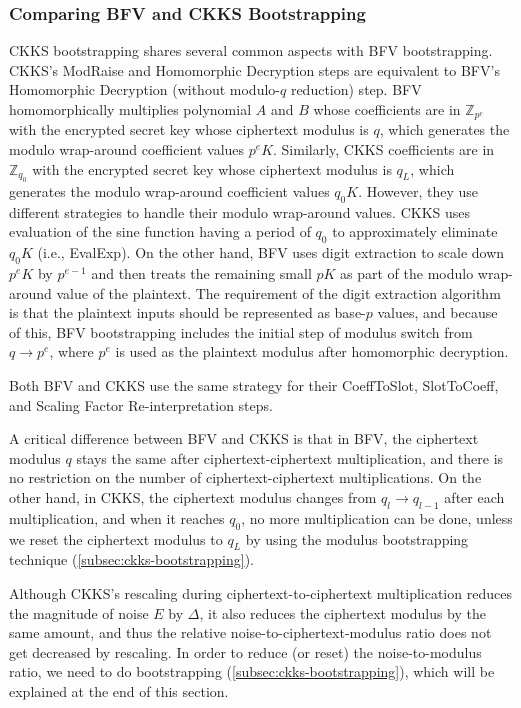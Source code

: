 \subsubsection{Comparing BFV and CKKS Bootstrapping}
\label{subsubsec:bfv-bootstrapping-ckks-comparison}

CKKS bootstrapping shares several common aspects with BFV bootstrapping. CKKS's \textsf{ModRaise} and \textsf{Homomorphic Decryption} steps are equivalent to BFV's \textsf{Homomorphic Decryption (without modulo-$q$ reduction)} step. BFV homomorphically multiplies polynomial $A$ and $B$ whose coefficients are in $\mathbb{Z}_{p^e}$ with the encrypted secret key whose ciphertext modulus is $q$, which generates the modulo wrap-around coefficient values $p^eK$. Similarly, CKKS coefficients are in $\mathbb{Z}_{q_0}$ with the encrypted secret key whose ciphertext modulus is $q_L$, which generates the modulo wrap-around coefficient values $q_0K$. However, they use different strategies to handle their modulo wrap-around values. CKKS uses evaluation of the sine function having a period of $q_0$ to approximately eliminate $q_0K$ (i.e., \textsf{EvalExp}). On the other hand, BFV uses digit extraction to scale down $p^eK$ by $p^{e-1}$ and then treats the remaining small $pK$ as part of the modulo wrap-around value of the plaintext. The requirement of the digit extraction algorithm is that the plaintext inputs should be represented as base-$p$ values, and because of this, BFV bootstrapping includes the initial step of modulus switch from $q \rightarrow p^e$, where $p^e$ is used as the plaintext modulus after homomorphic decryption. 

Both BFV and CKKS use the same strategy for their \textsf{CoeffToSlot}, \textsf{SlotToCoeff}, and \textsf{Scaling Factor Re-interpretation} steps. 

 A critical difference between BFV and CKKS is that in BFV, the ciphertext modulus $q$ stays the same after ciphertext-ciphertext multiplication, and there is no restriction on the number of ciphertext-ciphertext multiplications. On the other hand, in CKKS, the ciphertext modulus changes from $q_l \rightarrow q_{l-1}$ after each multiplication, and when it reaches $q_0$, no more multiplication can be done, unless we reset the ciphertext modulus to $q_L$ by using the modulus bootstrapping technique (\autoref{subsec:ckks-bootstrapping}). 

 Although CKKS's rescaling during ciphertext-to-ciphertext multiplication reduces the magnitude of noise $E$ by $\Delta$, it also reduces the ciphertext modulus by the same amount, and thus the relative noise-to-ciphertext-modulus ratio does not get decreased by rescaling. In order to reduce (or reset) the noise-to-modulus ratio, we need to do bootstrapping (\autoref{subsec:ckks-bootstrapping}), which will be explained at the end of this section.


